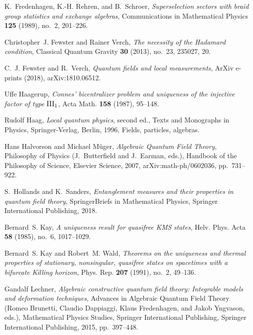 \documentclass[12pt,a4paper]{article}
\newcommand{\1}{\mathds{1}}                         %
\begin{document}
{\begin{thebibliography}{BDFY15}
	K.~Fredenhagen, K.-H. Rehren, and B.~Schroer, \emph{Superselection sectors with
		braid group statistics and exchange algebras}, Communications in Mathematical
	Physics \textbf{125} (1989), no.~2, 201--226.
	
	Christopher~J. Fewster and Rainer Verch, \emph{The necessity of the {H}adamard
		condition}, Classical Quantum Gravity \textbf{30} (2013), no.~23, 235027, 20.
	
	C.~J. {Fewster} and R.~{Verch}, \emph{{Quantum fields and local measurements}},
	ArXiv e-prints (2018), arXiv:1810.06512.
	
	Uffe Haagerup, \emph{Connes' bicentralizer problem and uniqueness of the
		injective factor of type {${\rm III}_1$}}, Acta Math. \textbf{158} (1987),
	95--148. 
	
	Rudolf Haag, \emph{Local quantum physics}, second ed., Texts and Monographs in
	Physics, Springer-Verlag, Berlin, 1996, Fields, particles, algebras.
	
	Hans {Halvorson} and Michael {M\"{u}ger}, \emph{{Algebraic Quantum Field
			Theory}}, Philosophy of Physics (J.~Butterfield and J.~Earman, eds.),
	Handbook of the Philosophy of Science, Elsevier Science, 2007,
	arXiv:math-ph/0602036, pp.~731--922.
	
	S.~Hollands and K.~Sanders, \emph{Entanglement measures and their properties in
		quantum field theory}, SpringerBriefs in Mathematical Physics, Springer
	International Publishing, 2018.
	
	Bernard~S. Kay, \emph{A uniqueness result for quasifree {KMS} states}, Helv.
	Phys. Acta \textbf{58} (1985), no.~6, 1017--1029. 
	
	Bernard~S. Kay and Robert~M. Wald, \emph{Theorems on the uniqueness and thermal
		properties of stationary, nonsingular, quasifree states on spacetimes with a
		bifurcate {K}illing horizon}, Phys. Rep. \textbf{207} (1991), no.~2, 49--136.
	
	Gandalf Lechner, \emph{Algebraic constructive quantum field theory: Integrable
		models and deformation techniques}, Advances in Algebraic Quantum Field
	Theory (Romeo Brunetti, Claudio Dappiaggi, Klaus Fredenhagen, and Jakob
	Yngvason, eds.), Mathematical Physics Studies, Springer International
	Publishing, Springer International Publishing, 2015, pp.~397--448.
	

\end{thebibliography}}
\end{document}
